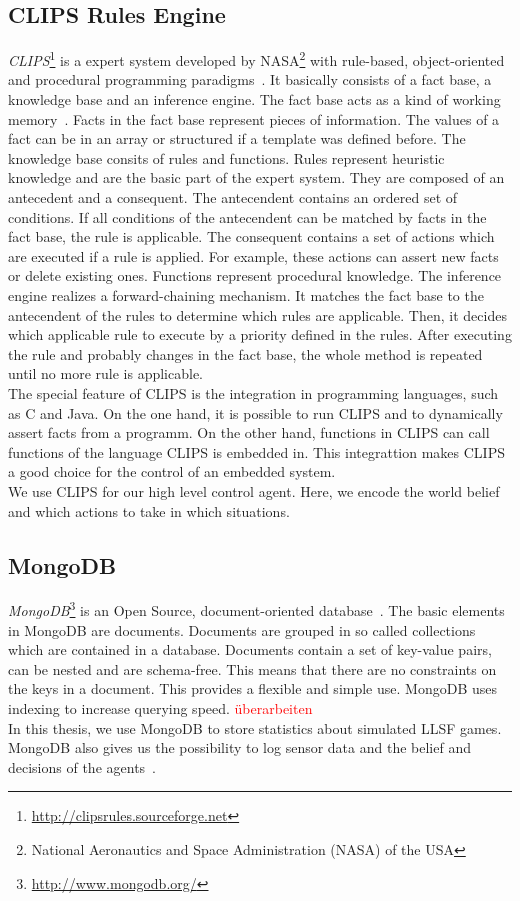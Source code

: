 \subsection{CLIPS Rules Engine}
\textit{CLIPS}\footnote{\url{http://clipsrules.sourceforge.net}} is a expert system developed by NASA\footnote{National Aeronautics and Space Administration (NASA) of the USA} with rule-based, object-oriented and procedural programming paradigms~\cite{Clips,clips_manual}. It basically consists of a fact base, a knowledge base and an inference engine. The fact base acts as a kind of working memory~\cite{Incremental}. Facts in the fact base represent pieces of information. The values of a fact can be in an array or structured if a template was defined before. The knowledge base consits of rules and functions. Rules represent heuristic knowledge and are the basic part of the expert system. They are composed of an antecedent and a consequent. The antecendent contains an ordered set of conditions. If all conditions of the antecendent can be matched by facts in the fact base, the rule is applicable. The consequent contains a set of actions which are executed if a rule is applied. For example, these actions can assert new facts or delete existing ones. Functions represent procedural knowledge. The inference engine realizes a forward-chaining mechanism. It matches the fact base to the antecendent of the rules to determine which rules are applicable. Then, it decides which applicable rule to execute by a priority defined in the rules. After executing the rule and probably changes in the fact base, the whole method is repeated until no more rule is applicable.\\
The special feature of CLIPS is the integration in programming languages, such as C and Java. On the one hand, it is possible to run CLIPS and to dynamically assert facts from a programm. On the other hand, functions in CLIPS can call functions of the language CLIPS is embedded in. This integrattion makes CLIPS a good choice for the control of an embedded system.\\
We use CLIPS for our high level control agent. Here, we encode the world belief and which actions to take in which situations.

\subsection{MongoDB}
\textit{MongoDB}\footnote{\url{http://www.mongodb.org/}} is an Open Source, document-oriented database~\cite{mongodb,KlingenDA}. The basic elements in MongoDB are documents. Documents are grouped in so called collections which are contained in a database. Documents contain a set of key-value pairs, can be nested and are schema-free. This means that there are no constraints on the keys in a document. This provides a flexible and simple use. MongoDB uses indexing to increase querying speed. \textcolor{red}{überarbeiten}\\
In this thesis, we use MongoDB to store statistics about simulated LLSF games. MongoDB also gives us the possibility to log sensor data and the belief and decisions of the agents~\cite{KlingenDA}.
